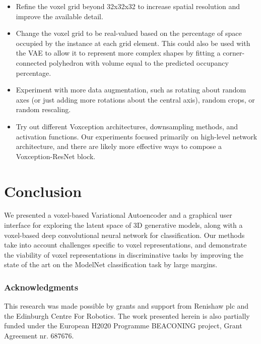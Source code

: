 \documentclass{article}
\begin{document}
\begin{itemize}

\item Refine the voxel grid beyond 32x32x32 to increase spatial resolution and improve the available detail. 

\item Change the voxel grid to be real-valued based on the percentage of space occupied by the instance at each grid element. This could also be used with the VAE to allow it to represent more complex shapes by fitting a corner-connected polyhedron with volume equal to the predicted occupancy percentage.

\item Experiment with more data augmentation, such as rotating about random axes (or just adding more rotations about the central axis), random crops, or random rescaling.

\item Try out different Voxception architectures, downsampling methods, and activation functions. Our experiments focused primarily on high-level network architecture, and there are likely more effective ways to compose a Voxception-ResNet block.

\end{itemize}


\section{Conclusion}
We presented a voxel-based Variational Autoencoder and a graphical user interface for exploring the latent space of 3D generative models, along with a voxel-based deep convolutional neural network for classification. Our methods take into account challenges specific to voxel representations, and demonstrate the viability of voxel representations in discriminative tasks by improving the state of the art on the ModelNet classification task by large margins.


\subsubsection*{Acknowledgments}

This research was made possible by grants and support from Renishaw plc and the Edinburgh Centre For Robotics. The work presented herein is also partially funded under the European H2020 Programme BEACONING project, Grant Agreement nr. 687676.





\end{document}
